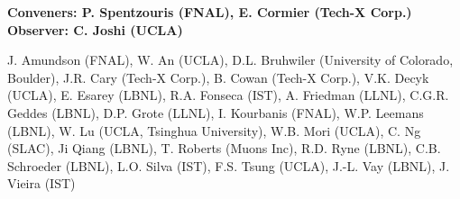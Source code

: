 

\begin{center}

\begin{large} {\bf Conveners: P. Spentzouris (FNAL), E. Cormier (Tech-X Corp.)\\
                   Observer: C. Joshi (UCLA)} \end{large}

J. Amundson (FNAL),
W. An (UCLA),
D.L. Bruhwiler (University of Colorado, Boulder),
J.R. Cary (Tech-X Corp.),
B. Cowan (Tech-X Corp.),
V.K. Decyk (UCLA),
E. Esarey (LBNL),
R.A. Fonseca (IST),
A. Friedman (LLNL),
C.G.R. Geddes (LBNL),
D.P. Grote (LLNL),
I. Kourbanis (FNAL),
W.P. Leemans (LBNL),
W. Lu (UCLA, Tsinghua University),
W.B. Mori (UCLA),
C. Ng (SLAC),
Ji Qiang (LBNL),
T. Roberts (Muons Inc),
R.D. Ryne (LBNL),
C.B. Schroeder (LBNL),
L.O. Silva (IST),
F.S. Tsung (UCLA),
J.-L. Vay (LBNL),
J. Vieira (IST)

\end{center}

